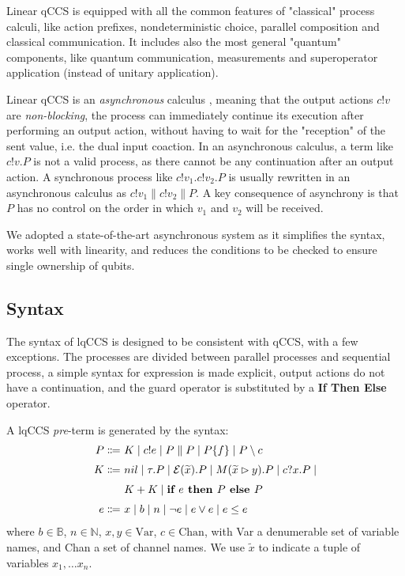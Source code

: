 Linear qCCS is equipped with all the common features of "classical" process calculi, like action prefixes, nondeterministic choice, parallel composition and classical communication. It includes also the most general "quantum" components, like quantum communication, measurements and superoperator application (instead of unitary application). 


Linear qCCS is an \textit{asynchronous} calculus  \cite{boudolAsynchronyPicalculus1992}, meaning that the output actions $c!v$ are \textit{non-blocking}, the process can immediately continue its execution after performing an output action, without having to wait for the "reception" of the sent value, i.e. the dual input coaction. In an asynchronous calculus, a term like $c!v.P$ is not a valid process, as there cannot be any continuation after an output action. A synchronous process like $c!v_1.c!v_2.P$ is usually rewritten in an asynchronous calculus as $c!v_1 \parallel c!v_2 \parallel P$. A key consequence of asynchrony is that $P$ has no control on the order in which $v_1$ and $v_2$ will be received.

We adopted a state-of-the-art asynchronous system as it simplifies the syntax, works well with linearity, and reduces the conditions to be checked to ensure single ownership of qubits.

\subsection{Syntax}

The syntax of lqCCS is designed to be consistent with qCCS, with a few exceptions. The processes are divided between parallel processes and sequential process, a simple syntax for expression is made explicit, output actions do not have a continuation, and the guard operator is substituted by a \textbf{If Then Else} operator.

A lqCCS \textit{pre}-term is generated by the syntax:
\begin{align*}
  P \Coloneqq &\ K \mid c!e \mid P \parallel P  \mid  P \{f\} \mid P \setminus c\\[0.1cm]
  K \Coloneqq &\ nil \mid \tau . P \mid \mathcal{E}(\widetilde{x}) . P \mid M(\widetilde{x} \rhd y) . P \mid c?x . P \mid \\[0.1cm]
  &\ K + K \mid \textbf{if } e \textbf{ then } P \textbf{ else } P \\[0.1cm]
  e \Coloneqq &\ x \mid b \mid n \mid \neg e \mid e \lor e \mid e \leq e
\end{align*}	
where $b \in \mathbb{B}$, $n \in \mathbb{N}$, $x, y \in \text{Var}$, $c \in \text{Chan}$, with Var a denumerable set of variable names, and Chan a set of channel names. We use $\widetilde{x}$ to indicate a tuple of variables $x_1, \ldots x_n$.

